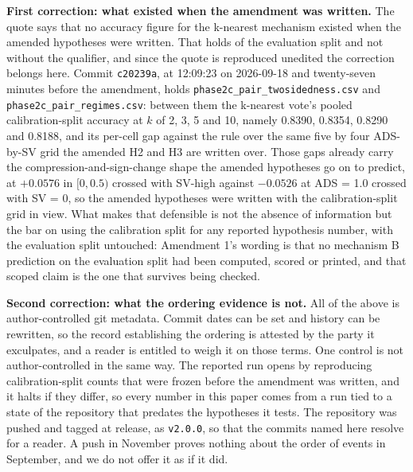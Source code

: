 \documentclass[11pt]{article}
\begin{document}
\textbf{First correction: what existed when the amendment was written.} The
quote says that no accuracy figure for the k-nearest mechanism existed when
the amended hypotheses were written. That holds of the evaluation split and
not without the qualifier, and since the quote is reproduced unedited the
correction belongs here. Commit \texttt{c20239a}, at 12:09:23 on 2026-09-18
and twenty-seven minutes before the amendment, holds \texttt{phase2c\_pair\_twosidedness.csv} and
\texttt{phase2c\_pair\_regimes.csv}: between them the k-nearest vote's pooled
calibration-split accuracy at $k$ of 2, 3, 5 and 10, namely 0.8390, 0.8354,
0.8290 and 0.8188, and its per-cell gap against the rule over the same five by
four ADS-by-SV grid the amended H2 and H3 are written over. Those gaps already
carry the compression-and-sign-change shape the amended hypotheses go on to
predict, at $+0.0576$ in $[0, 0.5)$ crossed with SV-high against $-0.0526$ at
ADS = 1.0 crossed with SV = 0, so the amended hypotheses were written with the
calibration-split grid in view. What makes that defensible is not the absence
of information but the bar on using the calibration split for any reported
hypothesis number, with the evaluation split untouched: Amendment 1's wording is that no
mechanism B prediction on the evaluation split had been computed, scored or
printed, and that scoped claim is the one that survives being checked.

\textbf{Second correction: what the ordering evidence is not.} All of the
above is author-controlled git metadata. Commit dates can be set and history
can be rewritten, so the record establishing the ordering is attested by the
party it exculpates, and a reader is entitled to weigh it on those terms. One
control is not author-controlled in the same way. The reported run opens by
reproducing calibration-split counts that were frozen before the amendment was
written, and it halts if they differ, so every number in this paper comes from
a run tied to a state of the repository that predates the hypotheses it tests.
The repository was pushed and tagged at release, as \texttt{v2.0.0}, so that the commits named here resolve for a reader. A push in November proves nothing about the order of events in September, and we do not offer it as if it did.
\end{document}
